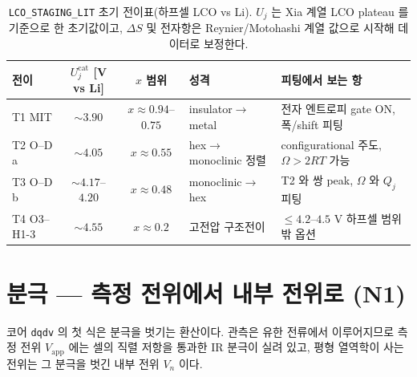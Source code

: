 \documentclass[11pt,a4paper]{article}
\newcommand{\app}{\mathrm{app}}
\newcommand{\cat}{\mathrm{cat}}
\newcommand{\code}[1]{\texttt{#1}}
\begin{document}
\begin{table}[t]
\centering\footnotesize
\renewcommand{\arraystretch}{1.18}
\caption{\code{LCO\_STAGING\_LIT} 초기 전이표(하프셀 LCO vs Li). $U_j$ 는 Xia 계열 LCO plateau 를 기준으로 한
초기값이고, $\Delta S$ 및 전자항은 Reynier/Motohashi 계열 값으로 시작해 데이터로 보정한다.}
\label{tab:lco_transitions}
\begin{tabular}{l c c l l}
\toprule
전이 & $U_j^\cat$ [V vs Li] & $x$ 범위 & 성격 & 피팅에서 보는 항 \\
\midrule
T1 MIT & $\sim3.90$ & $x\approx0.94$--$0.75$ & insulator$\to$metal & 전자 엔트로피 gate ON, 폭/shift 피팅 \\
T2 O--D a & $\sim4.05$ & $x\approx0.55$ & hex$\to$monoclinic 정렬 & configurational 주도, $\Omega>2RT$ 가능 \\
T3 O--D b & $\sim4.17$--$4.20$ & $x\approx0.48$ & monoclinic$\to$hex & T2 와 쌍 peak, $\Omega$ 와 $Q_j$ 피팅 \\
T4 O3--H1-3 & $\sim4.55$ & $x\approx0.2$ & 고전압 구조전이 & $\le4.2$--$4.5$ V 하프셀 범위 밖 옵션 \\
\bottomrule
\end{tabular}
\end{table}

\section{분극 — 측정 전위에서 내부 전위로 (N1)}\label{sec:pol}
코어 \code{dqdv} 의 첫 식은 분극을 벗기는 환산이다. 관측은 유한 전류에서 이루어지므로 측정 전위 $V_\app$ 에는 셀의
직렬 저항을 통과한 IR 분극이 실려 있고, 평형 열역학이 사는 전위는 그 분극을 벗긴 내부 전위 $V_n$ 이다.
\end{document}
